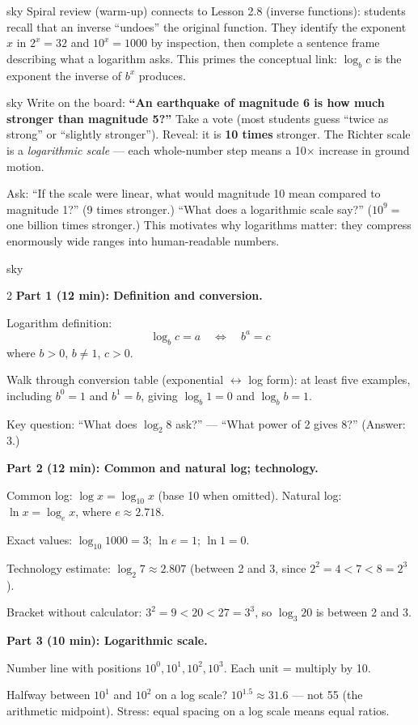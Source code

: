 \documentclass[10pt]{article}
\begin{document}
\begin{skillbox}{sky}
    Spiral review (warm-up) connects to Lesson 2.8 (inverse functions): students recall that
    an inverse ``undoes'' the original function. They identify the exponent $x$ in $2^x = 32$
    and $10^x = 1000$ by inspection, then complete a sentence frame describing what a logarithm
    asks. This primes the conceptual link: $\log_b c$ is the exponent the inverse of $b^x$ produces.
\end{skillbox}

\begin{skillbox}[Hook]{sky}
Write on the board: \textbf{``An earthquake of magnitude 6 is how much stronger than magnitude 5?''}
Take a vote (most students guess ``twice as strong'' or ``slightly stronger'').
Reveal: it is \textbf{10 times} stronger. The Richter scale is a \textit{logarithmic scale} ---
each whole-number step means a 10$\times$ increase in ground motion.

Ask: ``If the scale were linear, what would magnitude 10 mean compared to magnitude 1?''
(9 times stronger.) ``What does a logarithmic scale say?'' ($10^9 = $ one billion times stronger.)
This motivates why logarithms matter: they compress enormously wide ranges into human-readable numbers.
\end{skillbox}

\begin{skillbox}[Lesson]{sky}
\begin{multicols}{2}
\textbf{Part 1 (12 min): Definition and conversion.}

Logarithm definition:
\[
  \log_b c = a \quad\Leftrightarrow\quad b^a = c
\]
where $b > 0$, $b \ne 1$, $c > 0$.

Walk through conversion table (exponential $\leftrightarrow$ log form): at least five examples,
including $b^0 = 1$ and $b^1 = b$, giving $\log_b 1 = 0$ and $\log_b b = 1$.

Key question: ``What does $\log_2 8$ ask?'' --- ``What power of 2 gives 8?'' (Answer: 3.)

\columnbreak

\textbf{Part 2 (12 min): Common and natural log; technology.}

Common log: $\log x = \log_{10} x$ (base 10 when omitted).
Natural log: $\ln x = \log_e x$, where $e \approx 2.718$.

Exact values: $\log_{10} 1000 = 3$; $\ln e = 1$; $\ln 1 = 0$.

Technology estimate: $\log_2 7 \approx 2.807$ (between 2 and 3, since $2^2 = 4 < 7 < 8 = 2^3$).

Bracket without calculator: $3^2 = 9 < 20 < 27 = 3^3$, so $\log_3 20$ is between 2 and 3.

\textbf{Part 3 (10 min): Logarithmic scale.}

Number line with positions $10^0, 10^1, 10^2, 10^3$. Each unit = multiply by 10.

Halfway between $10^1$ and $10^2$ on a log scale? $10^{1.5} \approx 31.6$ --- not 55
(the arithmetic midpoint). Stress: equal spacing on a log scale means equal ratios.
\end{multicols}
\end{skillbox}
\end{document}
